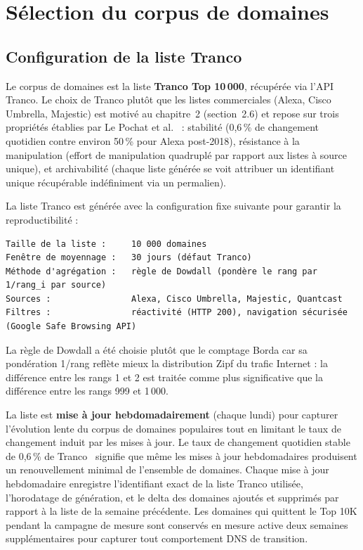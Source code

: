 \bigskip
\section{Sélection du corpus de domaines}
\label{sec:3.2}

\subsection{Configuration de la liste Tranco}
\label{subsec:3.2.1}

Le corpus de domaines est la liste \textbf{Tranco Top 10\,000}, récupérée via l'API Tranco. Le choix de Tranco plutôt que les listes commerciales (Alexa, Cisco Umbrella, Majestic) est motivé au chapitre~2 (section~2.6) et repose sur trois propriétés établies par Le Pochat et al.~\cite{LePochat2019} : stabilité (0,6\,\% de changement quotidien contre environ 50\,\% pour Alexa post-2018), résistance à la manipulation (effort de manipulation quadruplé par rapport aux listes à source unique), et archivabilité (chaque liste générée se voit attribuer un identifiant unique récupérable indéfiniment via un permalien).

La liste Tranco est générée avec la configuration fixe suivante pour garantir la reproductibilité :

\begin{verbatim}
Taille de la liste :     10 000 domaines
Fenêtre de moyennage :   30 jours (défaut Tranco)
Méthode d'agrégation :   règle de Dowdall (pondère le rang par 1/rang_i par source)
Sources :                Alexa, Cisco Umbrella, Majestic, Quantcast
Filtres :                réactivité (HTTP 200), navigation sécurisée (Google Safe Browsing API)
\end{verbatim}

La règle de Dowdall a été choisie plutôt que le comptage Borda car sa pondération 1/rang reflète mieux la distribution Zipf du trafic Internet : la différence entre les rangs 1 et 2 est traitée comme plus significative que la différence entre les rangs 999 et 1\,000.

La liste est \textbf{mise à jour hebdomadairement} (chaque lundi) pour capturer l'évolution lente du corpus de domaines populaires tout en limitant le taux de changement induit par les mises à jour. Le taux de changement quotidien stable de 0,6\,\% de Tranco~\cite{LePochat2019} signifie que même les mises à jour hebdomadaires produisent un renouvellement minimal de l'ensemble de domaines. Chaque mise à jour hebdomadaire enregistre l'identifiant exact de la liste Tranco utilisée, l'horodatage de génération, et le delta des domaines ajoutés et supprimés par rapport à la liste de la semaine précédente. Les domaines qui quittent le Top 10K pendant la campagne de mesure sont conservés en mesure active deux semaines supplémentaires pour capturer tout comportement DNS de transition.

